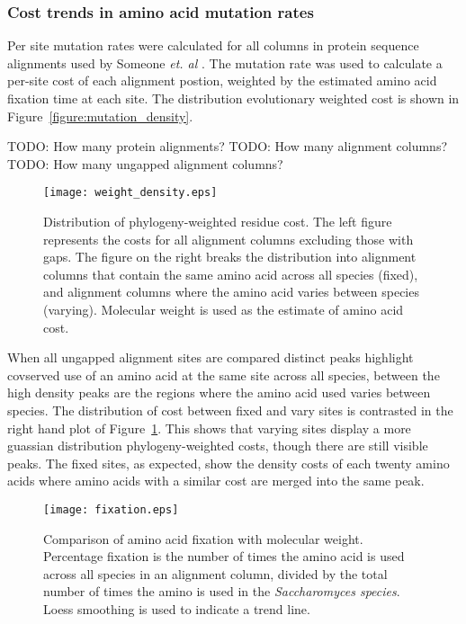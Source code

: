 \subsubsection{Cost trends in amino acid mutation rates}

Per site mutation rates were calculated for all columns in protein sequence alignments used by Someone \emph{et. al} \cite{alignment}. The mutation rate was used to calculate a per-site cost of each alignment postion, weighted by the estimated amino acid fixation time at each site. The distribution evolutionary weighted cost is shown in Figure~\vref{figure:mutation_density}.

TODO: How many protein alignments?
TODO: How many alignment columns?
TODO: How many ungapped alignment columns?

\begin{figure}
  \centering
  \texttt{[image: weight\_density.eps]}
  \caption[Distribution of phylogeny-weighted residue cost.]{Distribution of phylogeny-weighted residue cost. The left figure represents the costs for all alignment columns excluding those with gaps. The figure on the right breaks the distribution into alignment columns that contain the same amino acid across all species (fixed), and alignment columns where the amino acid varies between species (varying). Molecular weight is used as the estimate of amino acid cost.}
  \label{figure:mutation_density}
\end{figure}

When all ungapped alignment sites are compared distinct peaks highlight covserved use of an amino acid at the same site across all species, between the high density peaks are the regions where the amino acid used varies between species. The distribution of cost between fixed and vary sites is contrasted in the right hand plot of Figure~\ref{figure:mutation_density}. This shows that varying sites display a more guassian distribution phylogeny-weighted costs, though there are still visible peaks. The fixed sites, as expected, show the density costs of each twenty amino acids where amino acids with a similar cost are merged into the same peak.

\begin{figure}
  \centering
  \texttt{[image: fixation.eps]}
  \caption[Comparison of amino acid fixation with molecular weight]{Comparison of amino acid fixation with molecular weight. Percentage fixation is the number of times the amino acid is used across all species in an alignment column, divided by the total number of times the amino is used in the \emph{Saccharomyces species}. Loess smoothing is used to indicate a trend line.}
  \label{figure:fixation_weight}
\end{figure}

